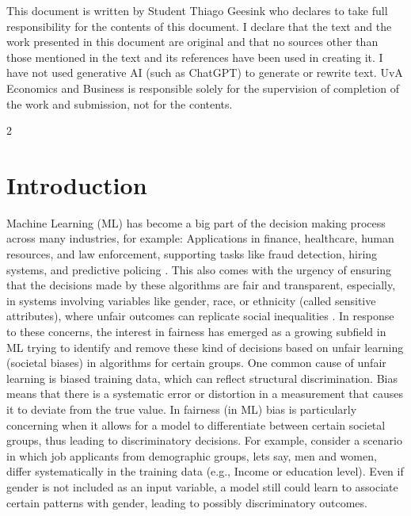 \documentclass[ecta,nameyear,final]{econsocart}
\numberwithin{equation}{section}
\theoremstyle{plain}
\theoremstyle{definition}
\begin{document}
This document is written by Student Thiago Geesink who declares to take full responsibility for the contents of this document.
I declare that the text and the work presented in this document are original and that no sources other than those mentioned in the text and its references have been used in creating it. I have not used generative AI (such as ChatGPT) to generate or rewrite text.
UvA Economics and Business is responsible solely for the supervision of completion of the work and submission, not for the contents.
\newpage
\begin{multicols}{2}
\section{Introduction}
Machine Learning (ML) has become a big part of the decision making process across many industries, for example: Applications in finance, healthcare, human resources, and law enforcement, supporting tasks like fraud detection, hiring systems, and predictive policing \citep{Webb2025Healthcare, Rizinski2022}. This also comes with the urgency of ensuring that the decisions made by these algorithms are fair and transparent, especially, in systems involving variables like gender, race, or ethnicity (called sensitive attributes), where unfair outcomes can replicate social inequalities \citep{LeGouic2020}.
\newline \newline
In response to these concerns, the interest in fairness has emerged as a growing subfield in ML trying to identify and remove these kind of decisions based on unfair learning (societal biases) in algorithms for certain groups.
\newline \newline
One common cause of unfair learning is biased training data, which can reflect structural discrimination. Bias means that there is a systematic error or distortion in a measurement that causes it to deviate from the true value.
\newline \newline
In fairness (in ML) bias is particularly concerning when it allows for a model to differentiate between certain societal groups, thus leading to discriminatory decisions.
\newline \newline
For example, consider a scenario in which job applicants from demographic groups, lets say, men and women, differ systematically in the training data (e.g., Income or education level). Even if gender is not included as an input variable, a model still could learn to associate certain patterns with gender, leading to possibly discriminatory outcomes.

\end{multicols}
\end{document}
